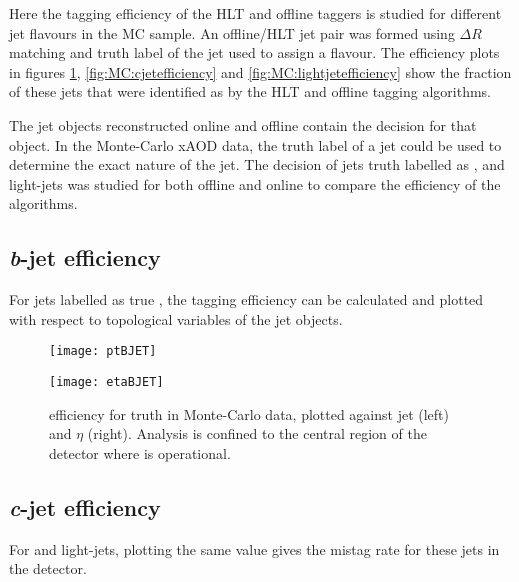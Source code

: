 	Here the tagging efficiency of the HLT and offline taggers is studied for different jet flavours in the MC sample. An offline/HLT jet pair was formed using $\Delta R$ matching and truth label of the jet used to assign a flavour. The efficiency plots in figures \ref{fig:MC:bjetefficiency}, \ref{fig:MC:cjetefficiency} and \ref{fig:MC:lightjetefficiency} show the fraction of these jets that were identified as \bjets by the HLT and offline tagging algorithms.
	
	The jet objects reconstructed online and offline contain the \btagging decision for that object. In the Monte-Carlo xAOD data, the truth label of a jet could be used to determine the exact nature of the jet. The \btagging decision of jets truth labelled as \bjets, \cjets and light-jets was studied for both offline and online to compare the efficiency of the algorithms. 

	\subsection{\textit{b}-jet efficiency}
	
	For jets labelled as true \bjets, the tagging efficiency can be calculated and plotted with respect to topological variables of the jet objects.

		\begin{figure}[h]
			\centering
			\begin{minipage}[h]{0.45\linewidth}
				\texttt{[image: ptBJET]}

			\end{minipage}
			\quad
			\begin{minipage}[h]{0.45\linewidth}
				\texttt{[image: etaBJET]}
			\end{minipage}
			\caption{\btagging efficiency for truth \bjets in Monte-Carlo data, plotted against jet \pt (left) and $\eta$ (right). Analysis is confined to the central region of the detector where \btagging is operational.}
			\label{fig:MC:bjetefficiency}
		\end{figure}


	\subsection{\textit{c}-jet efficiency}
	
	For \cjets and light-jets, plotting the same value gives the mistag rate for these jets in the detector. 


